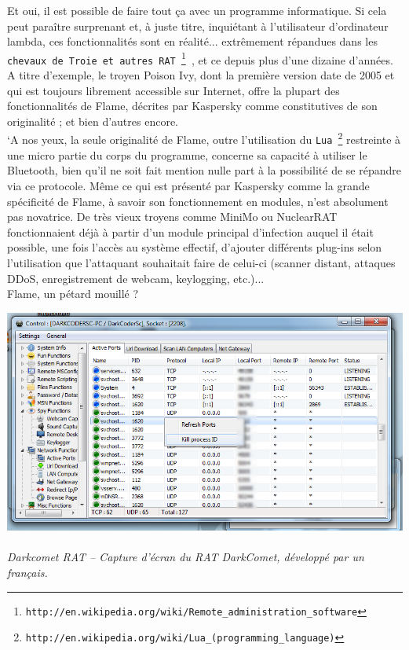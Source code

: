\documentclass[11pt,twoside,a4paper]{article}
\begin{document}
Et oui, il est possible de faire tout \c{c}a avec un programme informatique. Si cela peut para{\^i}tre surprenant et, {\`a} juste titre, inqui{\'e}tant {\`a} l'utilisateur d'ordinateur lambda, ces fonctionnalit{\'e}s sont en r{\'e}alit{\'e}... extr{\^e}mement r{\'e}pandues dans les \texttt{chevaux de Troie et autres RAT~\footnote{\texttt{http://en.wikipedia.org/wiki/Remote\_administration\_software}} }, et ce depuis plus d'une dizaine d'ann{\'e}es. A titre d'exemple, le troyen Poison Ivy, dont la premi{\`e}re version date de 2005 et qui est toujours librement accessible sur Internet, offre la plupart des fonctionnalit{\'e}s de Flame, d{\'e}crites par Kaspersky comme constitutives de son originalit{\'e} ; et bien d'autres encore.~\\

{`A} nos yeux, la seule originalit{\'e} de Flame, outre l'utilisation du \texttt{Lua~\footnote{\texttt{http://en.wikipedia.org/wiki/Lua\_(programming\_language)}}} restreinte {\`a} une micro partie du corps du programme, concerne sa capacit{\'e} {\`a} utiliser le Bluetooth, bien qu'il ne soit fait mention nulle part {\`a} la possibilit{\'e} de se r{\'e}pandre via ce protocole. M{\^e}me ce qui est pr{\'e}sent{\'e} par Kaspersky comme la grande sp{\'e}cificit{\'e} de Flame, {\`a} savoir son fonctionnement en modules, n'est absolument pas novatrice. De tr{\`e}s vieux troyens comme MiniMo ou NuclearRAT fonctionnaient d{\'e}j{\`a} {\`a} partir d'un module principal d'infection auquel il {\'e}tait possible, une fois l'acc{\`e}s au syst{\`e}me effectif, d'ajouter diff{\'e}rents plug-ins selon l'utilisation que l'attaquant souhaitait faire de celui-ci (scanner distant, attaques DDoS, enregistrement de webcam, keylogging, etc.)...~\\

Flame, un p{\'e}tard mouill{\'e} ?~\\

\begin{center}
	\includegraphics[width=16.00cm]{img/darkcomet.png}
	~\\ \emph{Darkcomet RAT -- Capture d'{\'e}cran du RAT DarkComet, d{\'e}velopp{\'e} par un fran\c{c}ais. }
\end{center}
\end{document}
